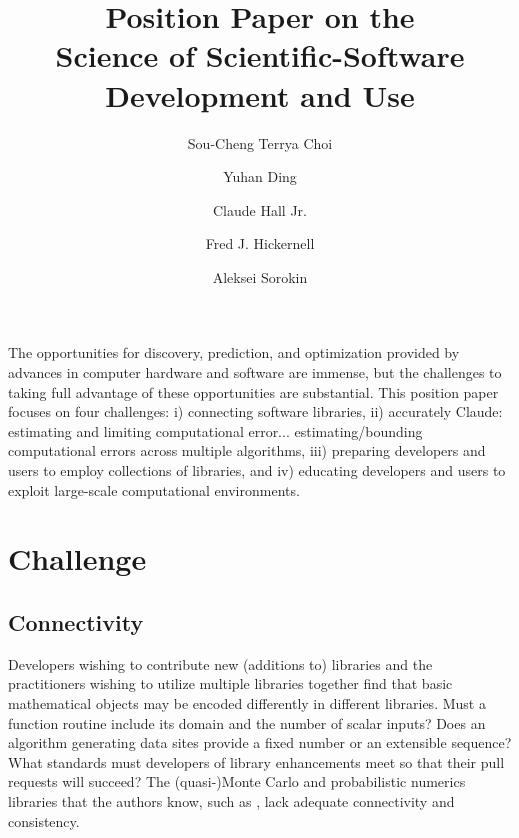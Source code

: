 \documentclass{amsart}
\newcommand{\CDHJNote}[1]{{\color{red}Claude: #1}}
\begin{document}
\title{Position Paper on the \\ Science of Scientific-Software Development and Use}
\author{\vspace{-2ex}Sou-Cheng Terrya Choi}
\address[Choi, Ding, Hickernell, Sorokin]{Department of Applied Mathematics, RE 220, 10 W. 32nd St., Chicago, IL 60616}
\author{Yuhan Ding}
\author{Claude Hall Jr.}
\address[Hall]{Birmingham Southern College, 900 Arkadelpha Rd, Birmingham, AL, 35254}
\author{Fred J. Hickernell}
\author{Aleksei Sorokin}



\maketitle

\vspace{-5ex}

The opportunities for discovery, prediction, and optimization provided by advances in computer hardware and software are immense, but the challenges to taking full advantage of these opportunities are substantial. This position paper focuses on four challenges: i) connecting software libraries, ii) accurately 
\CDHJNote{estimating and limiting computational error...}
estimating/bounding computational errors across multiple algorithms, iii) preparing developers and users to employ collections of libraries, and iv) educating developers and users to exploit large-scale computational environments.


\section{Challenge} %
\subsection{Connectivity} 
Developers wishing to contribute new (additions to) libraries and the practitioners wishing to utilize multiple libraries together find that basic mathematical objects may be encoded differently in different libraries.  Must a function routine include its domain and the number of scalar inputs?  Does an algorithm generating data sites provide a fixed number or an extensible sequence?  What standards must developers of library enhancements meet so that their pull requests will succeed? The (quasi-)Monte Carlo and probabilistic numerics libraries that the authors know, such as \cite{QMCPy2020a,SciPyQMC,STAN,probnum}, lack  adequate connectivity and consistency.
\end{document}
